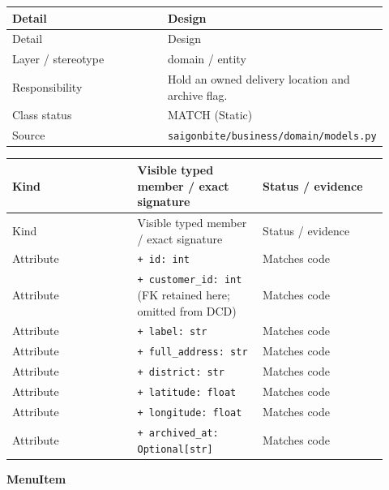 \begin{longtable}{>{\raggedright\arraybackslash}p{0.4600\linewidth}>{\raggedright\arraybackslash}p{0.4600\linewidth}}
Detail & Design \\
\hline\endfirsthead
Detail & Design \\
\hline\endhead
Layer / stereotype & domain / \guillemotleft{}entity\guillemotright{} \\
Responsibility & Hold an owned delivery location and archive flag. \\
Class status & MATCH (Static) \\
Source & \texttt{saigonbite/\allowbreak{}business/\allowbreak{}domain/\allowbreak{}models.\allowbreak{}py} \\
\end{longtable}
\begin{longtable}{>{\raggedright\arraybackslash}p{0.3067\linewidth}>{\raggedright\arraybackslash}p{0.3067\linewidth}>{\raggedright\arraybackslash}p{0.3067\linewidth}}
Kind & Visible typed member / exact signature & Status / evidence \\
\hline\endfirsthead
Kind & Visible typed member / exact signature & Status / evidence \\
\hline\endhead
Attribute & \texttt{+ id: int} & Matches code \\
Attribute & \texttt{+ customer\_\allowbreak{}id: int} (FK retained here; omitted from DCD) & Matches code \\
Attribute & \texttt{+ label: str} & Matches code \\
Attribute & \texttt{+ full\_\allowbreak{}address: str} & Matches code \\
Attribute & \texttt{+ district: str} & Matches code \\
Attribute & \texttt{+ latitude: float} & Matches code \\
Attribute & \texttt{+ longitude: float} & Matches code \\
Attribute & \texttt{+ archived\_\allowbreak{}at: Optional[str]} & Matches code \\
\end{longtable}
\textbf{MenuItem}

